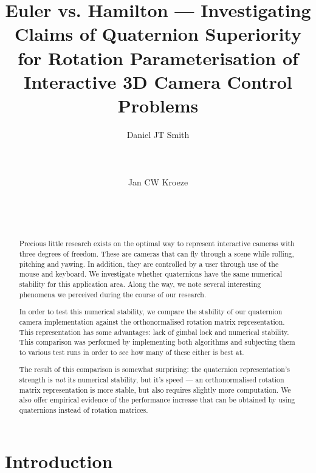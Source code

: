\documentclass{acm_proc_article-sp}
\title{Euler vs. Hamilton --- Investigating Claims of Quaternion Superiority for Rotation Parameterisation of Interactive 3D Camera Control Problems}
\author
{
    \alignauthor
    Daniel JT Smith \\
    \affaddr{University of Pretoria} \\
    \affaddr{Lynnwood Road} \\
    \affaddr{Pretoria} \\
    \email{u11306026@tuks.co.za}
    \alignauthor
    Jan CW Kroeze \\
    \affaddr{University of Pretoria} \\
    \affaddr{Lynnwood Road} \\
    \affaddr{Pretoria} \\
    \email{jkroeze@cs.up.ac.za}
}
\date{}
\begin{document}
\maketitle

\begin{abstract}
Precious little research exists on the optimal way to represent interactive cameras with three degrees of freedom.
These are cameras that can fly through a scene while rolling, pitching and yawing.
In addition, they are controlled by a user through use of the mouse and keyboard.
We investigate whether quaternions have the same numerical stability for this application area.
Along the way, we note several interesting phenomena we perceived during the course of our research.

In order to test this numerical stability, we compare the stability of our quaternion camera implementation against the orthonormalised rotation matrix representation.
This representation has some advantages: lack of gimbal lock and numerical stability.
This comparison was performed by implementing both algorithms and subjecting them to various test runs in order to see how many of these either is best at.

The result of this comparison is somewhat surprising: the quaternion representation's strength is \emph{not} its numerical stability, but it's speed ---
an orthonormalised rotation matrix representation is more stable, but also requires slightly more computation.
We also offer empirical evidence of the performance increase that can be obtained by using quaternions instead of rotation matrices.

\end{abstract}



\section{Introduction}
\end{document}

